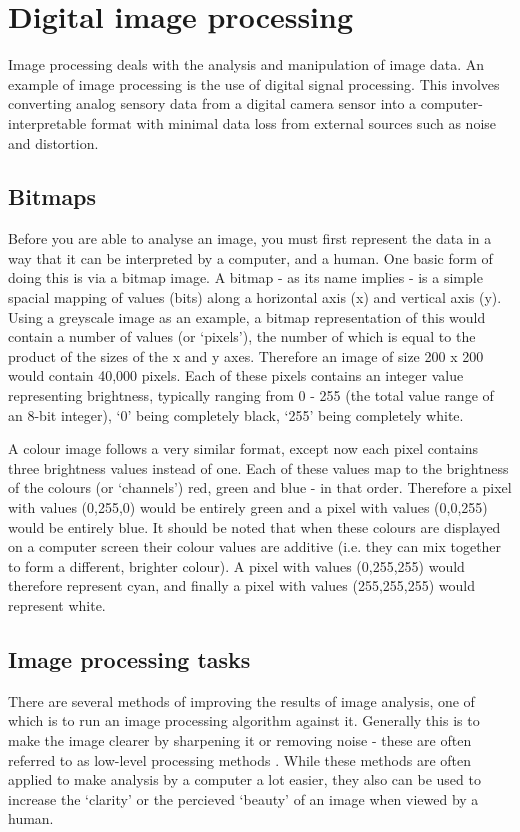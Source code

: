 \documentclass[a4paper,12pt]{report}
\begin{document}
  \section{Digital image processing}
   Image processing deals with the analysis and manipulation of image data. An example of image processing is the use of digital signal processing. This involves converting analog sensory data from a digital camera sensor into a computer-interpretable format with minimal data loss from external sources such as noise and distortion.\\

   \subsection{Bitmaps}
     Before you are able to analyse an image, you must first represent the data in a way that it can be interpreted by a computer, and a human. One basic form of doing this is via a bitmap image. A bitmap - as its name implies - is a simple spacial mapping of values (bits) along a horizontal axis (x) and vertical axis (y). Using a greyscale image as an example, a bitmap representation of this would contain a number of values (or ‘pixels’), the number of which is equal to the product of the sizes of the x and y axes. Therefore an image of size 200 x 200 would contain 40,000 pixels. Each of these pixels contains an integer value representing brightness, typically ranging from 0 - 255 (the total value range of an 8-bit integer), ‘0’ being completely black, ‘255’ being completely white.

     A colour image follows a very similar format, except now each pixel contains three brightness values instead of one. Each of these values map to the brightness of the colours (or ‘channels’) red, green and blue - in that order. Therefore a pixel with values (0,255,0) would be entirely green and a pixel with values (0,0,255) would be entirely blue. It should be noted that when these colours are displayed on a computer screen their colour values are additive (i.e. they can mix together to form a different, brighter colour). A pixel with values (0,255,255) would therefore represent cyan, and finally a pixel with values (255,255,255) would represent white.

   \subsection{Image processing tasks}
     There are several methods of improving the results of image analysis, one of which is to run an image processing algorithm against it. Generally this is to make the image clearer by sharpening it or removing noise - these are often referred to as low-level processing methods \citep{sonka2014image}. While these methods are often applied to make analysis by a computer a lot easier, they also can be used to increase the ‘clarity’ or the percieved ‘beauty’ of an image when viewed by a human.
\end{document}
